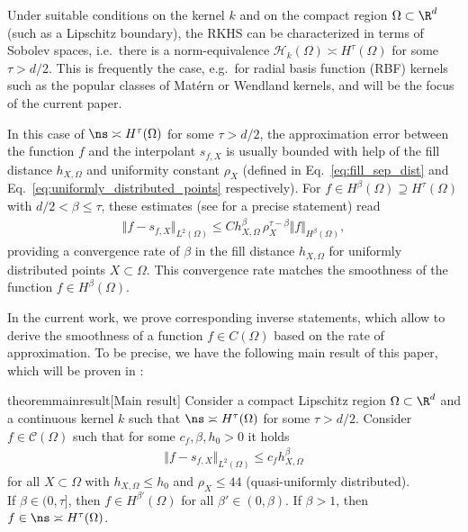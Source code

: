\documentclass[a4paper, 10pt]{article}
\begin{document}
%
%
%
%
%

%
%
%
%
%
%
%
%
%
%
%
%
%
%
%
%
%
Under suitable conditions on the kernel $k$ and on the compact region $\Omega \subset \R^d$ (such as a Lipschitz boundary), 
the RKHS can be characterized in terms of Sobolev spaces, i.e.\ there is a norm-equivalence $\mathcal{H}_k(\Omega) \asymp H^\tau(\Omega)$ for some $\tau > d/2$.
This is frequently the case, e.g.\ for radial basis function (RBF) kernels such as the popular classes of Matérn or Wendland kernels,
and will be the focus of the current paper.

In this case of $\ns \asymp H^\tau(\Omega)$ for some $\tau > d/2$, 
the approximation error between the function $f$ and the interpolant $s_{f, X}$ is usually bounded with help of the fill distance $h_{X, \Omega}$ and uniformity constant $\rho_X$ (defined in Eq.~\eqref{eq:fill_sep_dist} and Eq.~\eqref{eq:uniformly_distributed_points} respectively).
For $f \in H^\beta(\Omega) \supseteq H^\tau(\Omega)$ with $d/2 < \beta \leq \tau$, 
these estimates (see  for a precise statement) read
\begin{align}
\label{eq:direct_statement}
\Vert f - s_{f,X} \Vert_{L^2(\Omega)} \leq C h_{X, \Omega}^\beta \, \rho_{X}^{\tau-\beta} \Vert f \Vert_{H^\beta(\Omega)},
\end{align}
providing a convergence rate of $\beta$ in the fill distance $h_{X, \Omega}$ for uniformly distributed points $X \subset \Omega$.
This convergence rate matches the smoothness of the function $f \in H^\beta(\Omega)$.

In the current work, we prove corresponding inverse statements, 
which allow to derive the smoothness of a function $f \in C(\Omega)$ based on the rate of approximation. 
To be precise, we have the following main result of this paper, which will be proven in :

\begin{restatable}{theorem}{mainresult}[Main result]
\label{th:inverse_statement_generalized}
Consider a compact Lipschitz region $\Omega \subset \R^d$ and a continuous kernel $k$ such that $\ns \asymp H^\tau(\Omega)$ for some $\tau > d/2$.
Consider $f \in \mathcal{C}(\Omega)$ such that for some $c_f, \beta, h_0 > 0$ it holds
\begin{align}
\label{eq:inverse_statement_assumption}
\Vert f - s_{f, X} \Vert_{L^2(\Omega)} \leq c_f h_{X, \Omega}^\beta
\end{align}
for all $X \subset \Omega$ with $h_{X, \Omega} \leq h_0$ and $\rho_X \leq 44$ (quasi-uniformly distributed). \\
If $\beta \in (0, \tau]$,
then $f \in H^{\beta'}(\Omega)$ for all $\beta' \in (0, \beta)$.
If $\beta > 1$, then $f \in \ns \asymp H^\tau(\Omega)$. 
\end{restatable}
\end{document}
